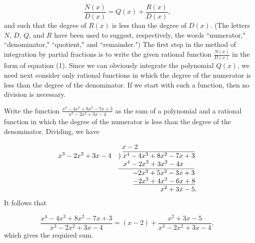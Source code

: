 \begin{equation}
\frac{N(x)}{D(x)} = Q(x) + \frac{R(x)}{D(x)},
\label{eq7.4.1}
\end{equation}
\noindent and such that the degree of $R(x)$ is less than the degree of $D(x)$. (The letters $N$, $D$, $Q$, and $R$ have been used to suggest, respectively, the words ``numerator," ``denominator," ``quotient," and
``remainder.") The first step in the method of integration by partial fractions is to write the given rational function $\frac{N(x)}{D(x)}$ in the form of equation (1). Since we can obviously integrate the polynomial $Q(x)$, we need next consider only rational functions in which the degree of the numerator is less than the degree of the denominator. If we start with such a function, then no division is necessary.

\begin{example}
Write the function $\frac{x^4 - 4x^3 + 8x^2 - 7x +3}{x^3 - 2x^2 + 3x - 4}$ as the sum of a polynomial and a rational function in which the degree of the numerator is less than the degree of the denominator. Dividing, we have

$$
\begin{array}{rl}
                               &\;\;x - 2   \\       
 x^3 - 2x^2 + 3x - 4&)\;\overline {x^4 - 4x^3 + 8x^2 - 7x + 3}   \\ 
                              &\hspace{.1in}x^4 - 2x^3 + 3x^2 - 4x \\    
                              &\overline{\;\;\;\;\;\;\;\, -2x^3 + 5x^2 - 3x + 3} \\   
                               &\hspace{.3in}\underline{-2x^3 + 4x^2 - 6x + 8} \\   
                               &\hspace{.85in}x^2 + 3x - 5. 
\end{array}
$$
\noindent It follows that 

$$
\frac{x^4 - 4x^3 + 8x^2 - 7x + 3}{x^3 - 2x^2 + 3x - 4} 
= (x - 2) + \frac{x^2 + 3x - 5}{x^3 - 2x^2 + 3x - 4},
$$
\noindent which gives the required sum.
\end{example}

